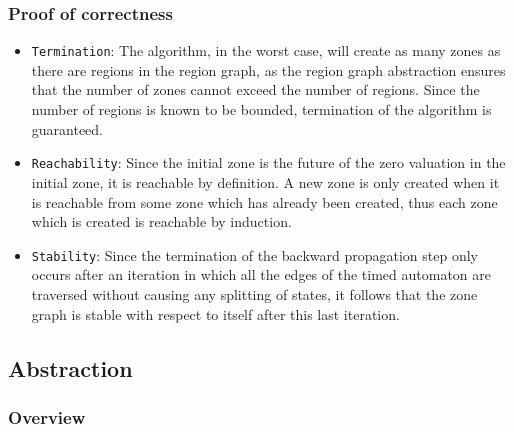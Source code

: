 \documentclass{article}
\begin{document}
\subsubsection{Proof of correctness}

\begin{itemize}

\item \texttt{Termination}: The algorithm, in the worst case,
  will create as many zones as there are regions in the region graph,
  as the region graph abstraction ensures that the number of zones
  cannot exceed the number of regions. Since the number of regions is
  known to be bounded, termination of the algorithm is
  guaranteed.

\item \texttt{Reachability}: Since the initial zone is the future of
  the zero valuation in the initial zone, it is reachable by
  definition. A new zone is only created when it is reachable from some
  zone which has already been created, thus each zone which is created
  is reachable by induction.

\item \texttt{Stability}: Since the termination of the backward
  propagation step only occurs after an iteration in which all the
  edges of the timed automaton are traversed without causing any
  splitting of states, it follows that the zone graph is stable with
  respect to itself after this last iteration.

\end{itemize}

\subsection{Abstraction}

\subsubsection{Overview}
\end{document}
